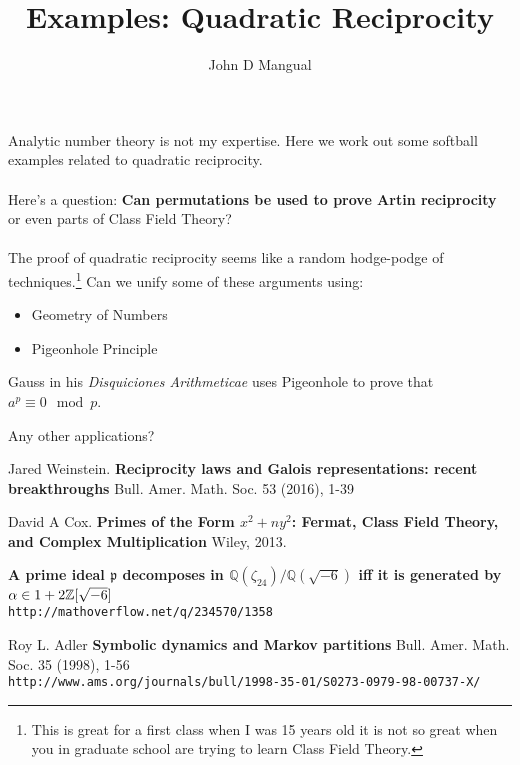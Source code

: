 \documentclass[12pt]{article}
\title{\textbf{ Examples:  Quadratic Reciprocity}}
\author{John D Mangual}
\date{}
\begin{document}
\selectfont \fontsize{25}{30}\selectfont

\maketitle

\noindent Analytic number theory is not my expertise.  Here we work out some softball examples related to quadratic reciprocity. \\ \\
Here's a question: \textbf{Can permutations be used to prove Artin reciprocity} or even parts of Class Field Theory? \\ \\
The proof of quadratic reciprocity seems like a random hodge-podge of techniques.\footnote{This is great for a first class when I was 15 years old it is not so great when you in graduate school are trying to learn Class Field Theory.} Can we unify some of these arguments using:
\begin{itemize}
\item Geometry of Numbers
\item Pigeonhole Principle
\end{itemize}
Gauss in his \textit{Disquiciones Arithmeticae} uses Pigeonhole to prove that $a^p \equiv 0 \mod p$. 

\newpage 

\noindent Any other applications?

\newpage  

\selectfont \fontsize{12}{10}\selectfont


\begin{thebibliography}{}

\item Jared Weinstein. \textbf{Reciprocity laws and Galois representations: recent breakthroughs} Bull. Amer. Math. Soc. 53 (2016), 1-39 

\item David A Cox. \textbf{Primes of the Form $x^2+ny^2$: Fermat, Class Field Theory, and Complex Multiplication} Wiley, 2013.

\item \textbf{A prime ideal $\mathfrak{p}$ decomposes in $\mathbb{Q}(\zeta_{24})/\mathbb{Q}(\sqrt{-6})$ iff it is generated by $\alpha\in1+2\Bbb{Z}[\sqrt{-6}]$} \\ \texttt{http://mathoverflow.net/q/234570/1358}

\item Roy L. Adler \textbf{Symbolic dynamics and Markov partitions}  Bull. Amer. Math. Soc. 35 (1998), 1-56  \\ \texttt{http://www.ams.org/journals/bull/1998-35-01/S0273-0979-98-00737-X/}


\end{thebibliography}
\end{document}
